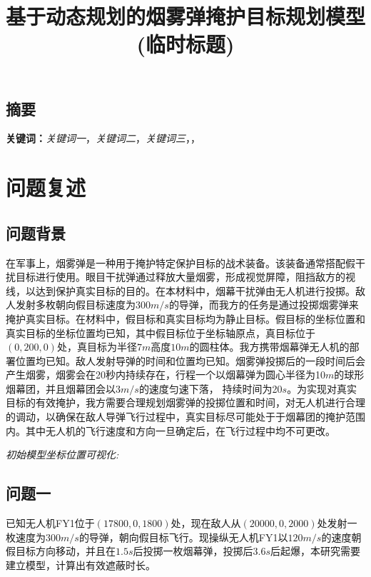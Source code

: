 \documentclass{article}
\title{\large 基于动态规划的烟雾弹掩护目标规划模型(临时标题)}
\date{}
\begin{document}
\maketitle
\begin{center}
\section*{摘要}
\end{center}
\vspace{-1em}


\noindent


\noindent
\textbf{关键词：}\textit{关键词一}，\textit{关键词二}，\textit{关键词三}，\textit{}，\textit{}



\section{问题复述}

\subsection{问题背景}

在军事上，烟雾弹是一种用于掩护特定保护目标的战术装备。该装备通常搭配假干扰目标进行使用。眼目干扰弹通过释放大量烟雾，形成视觉屏障，阻挡敌方的视线，以达到保护真实目标的目的。在本材料中，烟幕干扰弹由无人机进行投掷。敌人发射多枚朝向假目标速度为$300m/s$的导弹，而我方的任务是通过投掷烟雾弹来掩护真实目标。在材料中，假目标和真实目标均为静止目标。假目标的坐标位置和真实目标的坐标位置均已知，其中假目标位于坐标轴原点，真目标位于$(0,200,0)$处，真目标为半径$7m$高度$10m$的圆柱体。我方携带烟幕弹无人机的部署位置均已知。敌人发射导弹的时间和位置均已知。烟雾弹投掷后的一段时间后会产生烟雾，烟雾会在20秒内持续存在，行程一个以烟幕弹为圆心半径为10$m$的球形烟幕团，并且烟幕团会以$3 m/s$的速度匀速下落，
持续时间为20$s$。为实现对真实目标的有效掩护，我方需要合理规划烟雾弹的投掷位置和时间，对无人机进行合理的调动，以确保在敌人导弹飞行过程中，真实目标尽可能处于于烟幕团的掩护范围内。其中无人机的飞行速度和方向一旦确定后，在飞行过程中均不可更改。

\textit{初始模型坐标位置可视化:}

\subsection{问题一}

已知无人机FY1位于$(17800,0,1800)$处，现在敌人从$(20000,0,2000)$处发射一枚速度为$300m/s$的导弹，朝向假目标飞行。现操纵无人机FY1以$120m/s$的速度朝假目标方向移动，并且在$1.5s$后投掷一枚烟幕弹，投掷后$3.6s$后起爆，本研究需要建立模型，计算出有效遮蔽时长。
\end{document}
